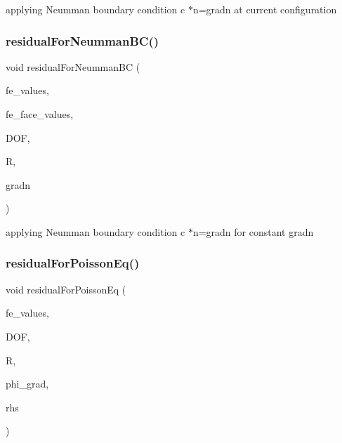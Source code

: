 applying Neumman boundary condition  c $\ast$n=gradn at current configuration \mbox{\label{class_residual_a1e66cf9fc807561fc00cffb93c52d37d}} 
\subsubsection{\texorpdfstring{residual\+For\+Neumman\+B\+C()}{residualForNeummanBC()}\hspace{0.1cm}{\footnotesize\ttfamily [4/4]}}
{\footnotesize\ttfamily void residual\+For\+Neumman\+BC (\begin{DoxyParamCaption}\item[{const F\+E\+Values$<$ dim $>$ \&}]{fe\+\_\+values,  }\item[{const F\+E\+Face\+Values$<$ dim $>$ \&}]{fe\+\_\+face\+\_\+values,  }\item[{unsigned int}]{D\+OF,  }\item[{dealii\+::\+Table$<$ 1, T $>$ \&}]{R,  }\item[{double}]{gradn }\end{DoxyParamCaption})}

applying Neumman boundary condition  c $\ast$n=gradn for constant gradn \mbox{\label{class_residual_af1d58eecf6eeae74de2f7ebc6a158b18}} 
\subsubsection{\texorpdfstring{residual\+For\+Poisson\+Eq()}{residualForPoissonEq()}\hspace{0.1cm}{\footnotesize\ttfamily [1/4]}}
{\footnotesize\ttfamily void residual\+For\+Poisson\+Eq (\begin{DoxyParamCaption}\item[{const F\+E\+Values$<$ dim $>$ \&}]{fe\+\_\+values,  }\item[{unsigned int}]{D\+OF,  }\item[{dealii\+::\+Table$<$ 1, T $>$ \&}]{R,  }\item[{dealii\+::\+Table$<$ 2, T $>$ \&}]{phi\+\_\+grad,  }\item[{dealii\+::\+Table$<$ 1, T $>$ \&}]{rhs }\end{DoxyParamCaption})}

